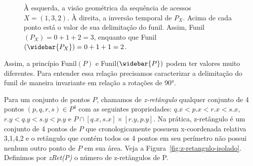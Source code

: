 \begin{figure}
    \caption{À esquerda, a visão geométrica da sequência de acessos $X = (1,3,2)$. À direita, a inversão temporal de $P_X$. Acima de cada ponto está o valor de sua delimitação do funil. Assim, Funil$(P_X) = 0 + 1 + 2 = 3$, enquanto que Funil$(\protect \widebar{P_X}) = 0 + 1 + 1 = 2$.}
\label{fig:espelhamento-de-funil-2}
\end{figure}

Assim, a princípio Funil$(P)$ e Funil$(\widebar{P})$ podem ter valores muito diferentes. Para entender essa relação precisamos caracterizar a delimitação do funil de maneira invariante em relação a rotações de 90°. 

Para um conjunto de pontos $P$, chamamos de \textit{z-retângulo} qualquer conjunto de 4 pontos $(p,q,r,s) \in P^4$ com as seguintes propriedades: $q.x < p.x < r.x < s.x$, $r.y < q.y < s.y < p.y$ e $P \cap [q.x,s.x] \times [r.y,p.y]$. Na prática, z-retângulo é um conjunto de 4 pontos de $P$ que cronologicamente possuem x-coordenada relativa 3,1,4,2 e o retângulo que contém todos os 4 pontos em seu perímetro não possui nenhum outro ponto de $P$ em sua área. Veja a Figura~\ref{fig:z-retangulo-isolado}. Definimos por \textit{zRet(P)} o número de z-retângulos de P.

